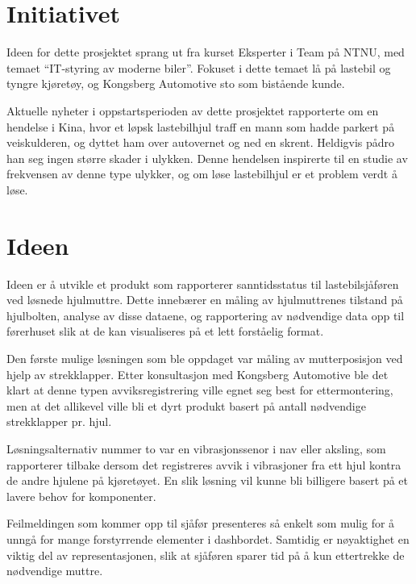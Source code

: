 \section{Initiativet}
Ideen for dette prosjektet sprang ut fra kurset Eksperter i Team på NTNU, med 
temaet ``IT-styring av moderne biler''. Fokuset i dette temaet lå på lastebil 
og tyngre kjøretøy, og Kongsberg Automotive sto som bistående kunde.

Aktuelle nyheter i oppstartsperioden av dette prosjektet rapporterte om en 
hendelse i Kina, hvor et løpsk lastebilhjul traff en mann som hadde parkert på 
veiskulderen, og dyttet ham over autovernet og ned en skrent. Heldigvis pådro 
han seg ingen større skader i ulykken. Denne hendelsen inspirerte til en studie 
av frekvensen av denne type ulykker, og om løse lastebilhjul er et problem 
verdt å løse.

\section{Ideen}
Ideen er å utvikle et produkt som rapporterer sanntidsstatus til lastebilsjåføren 
ved løsnede hjulmuttre. Dette innebærer en måling av hjulmuttrenes tilstand på 
hjulbolten, analyse av disse dataene, og rapportering av nødvendige data 
opp til førerhuset slik at de kan visualiseres på et lett forståelig format.

Den første mulige løsningen som ble oppdaget var måling av mutterposisjon ved 
hjelp av strekklapper. Etter konsultasjon med Kongsberg Automotive ble det klart 
at denne typen avviksregistrering ville egnet seg best for ettermontering, 
men at det allikevel ville bli et dyrt produkt basert på antall nødvendige 
strekklapper pr. hjul. 

Løsningsalternativ nummer to var en vibrasjonssenor i nav eller aksling, som 
rapporterer tilbake dersom det registreres avvik i vibrasjoner fra ett hjul 
kontra de andre hjulene på kjøretøyet. En slik løsning vil kunne bli billigere 
basert på et lavere behov for komponenter.

Feilmeldingen som kommer opp til sjåfør presenteres så enkelt som mulig for å unngå for mange forstyrrende elementer i dashbordet. Samtidig er nøyaktighet en viktig del av representasjonen, slik at sjåføren sparer tid på å kun ettertrekke de nødvendige muttre.
